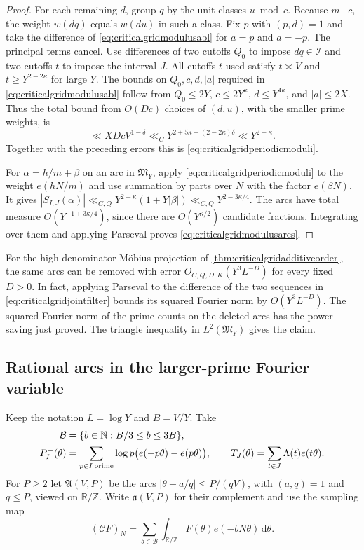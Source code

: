 \documentclass[11pt,a4paper]{article}
\numberwithin{equation}{section}
\newcommand{\ud}{\mathrm d}
\begin{document}
\begin{proof}
For each remaining $d$, group $q$ by the unit classes $u\bmod c$.
Because $m\mid c$, the weight $w(dq)$ equals $w(du)$ in such
a class. Fix $p$ with $(p,d)=1$ and take the difference of
\cref{eq:criticalgridmodulusabl} for $a=p$ and $a=-p$. The
principal terms cancel. Use differences of two cutoffs $Q_0$
to impose $dq\in\mathcal I$ and two cutoffs $t$ to impose
the interval $J$. All cutoffs $t$ used satisfy $t\asymp V$
and $t\ge Y^{2-2\kappa}$ for large $Y$. The bounds on
$Q_0,c,d,|a|$ required in \cref{eq:criticalgridmodulusabl}
follow from $Q_0\le 2Y$, $c\le 2Y^\kappa$,
$d\le Y^{4\kappa}$, and $|a|\le2X$.
Thus the total bound from $O(Dc)$ choices of $(d,u)$, with
the smaller prime weights, is
\[
 \ll X D c V^{1-\delta}
 \ll_C Y^{2+5\kappa-(2-2\kappa)\delta}
 \ll Y^{2-\kappa}.
\]
Together with the preceding errors this is
\cref{eq:criticalgridperiodicmoduli}.

For $\alpha=h/m+\beta$ on an arc in $\mathfrak M_Y$, apply
\cref{eq:criticalgridperiodicmoduli} to the weight $e(hN/m)$
and use summation by parts over $N$ with the factor $e(\beta N)$.
It gives $|S_{I,J}(\alpha)|\ll_{C,Q}Y^{2-\kappa}(1+Y|\beta|)
\ll_{C,Q}Y^{2-3\kappa/4}$. The arcs have total measure
$O(Y^{-1+3\kappa/4})$, since there are $O(Y^{\kappa/2})$
candidate fractions. Integrating over them and applying
Parseval proves \cref{eq:criticalgridmodulusarcs}.
\end{proof}

For the high-denominator M\"obius projection of
\cref{thm:criticalgridadditiveorder}, the same arcs can be removed
with error $O_{C,Q,D,K}(Y^3L^{-D})$ for every fixed $D>0$.
In fact, applying Parseval to the difference of the two sequences
in \cref{eq:criticalgridjointfilter} bounds its squared Fourier
norm by $O(Y^3L^{-D})$. The squared Fourier norm of the prime
counts on the deleted arcs has the power saving just proved.
The triangle inequality in $L^2(\mathfrak M_Y)$ gives the claim.

\clearpage
\subsection{Rational arcs in the larger-prime Fourier variable}

Keep the notation $L=\log Y$ and $B=V/Y$. Take
\begin{align*}
 \mathcal B&=\{b\in\mathbb N:B/3\le b\le3B\},\\
 P_I^-(\theta)&=\sum_{p\in I\,{\rm prime}}\log p
                       \bigl(e(-p\theta)-e(p\theta)\bigr),
 \qquad T_J(\theta)=\sum_{t\in J}\Lambda(t)e(t\theta).
\end{align*}
For $P\ge2$ let $\mathfrak A(V,P)$ be the arcs
$|\theta-a/q|\le P/(qV)$, with $(a,q)=1$ and $q\le P$,
viewed on $\mathbb R/\mathbb Z$. Write $\mathfrak a(V,P)$
for their complement and use the sampling map
\[
 (\mathcal C F)_N=\sum_{b\in\mathcal B}
         \int_{\mathbb R/\mathbb Z}F(\theta)e(-bN\theta)\,\ud\theta .
\]
\end{document}

